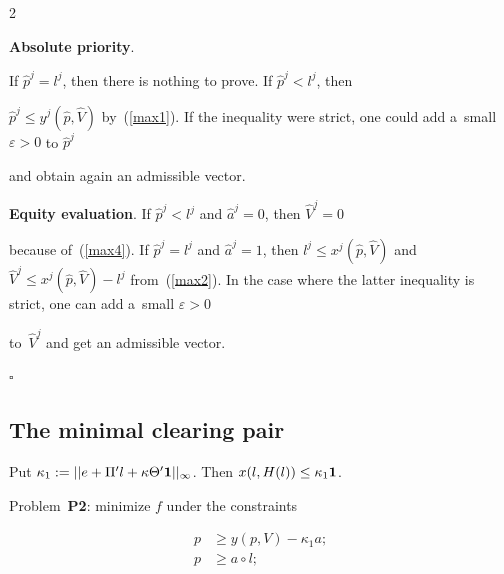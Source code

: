 \begin{multicols}{2}
\smallskip



 \noindent

 \textbf{Absolute priority}. 

 If $\hat p^j = l^j$, then there is nothing to prove. If $\hat p^j < l^j$, then 

 $\hat p^j \leq y^j(\hat  p,\hat  V)$ by~(\ref{max1}). If the inequality were strict, one could add a~small $\varepsilon>0$ to $\hat p^j$ 

 and obtain again an admissible vector.



\smallskip



\noindent

\textbf{Equity evaluation}. If $\hat p^j < l^j$ and $\hat a^j = 0$, then $\hat V^j = 0$ 

because of~(\ref{max4}). If $\hat p^j = l^j$ and $\hat a^j = 1$, then  $l^j \leq x^j(\hat  p,\hat  V)$ and $\hat V^j 

\leq x^j(\hat  p,\hat  V) - l^j$ from~(\ref{max2}). In the case where the latter inequality is strict, one can add a~small $\varepsilon>0$ 

to~$\hat V^j$ and get an admissible vector. 

 \hfill$\square$



\subsection{The minimal clearing pair}



\noindent

Put  $\kappa_1 := || e + \Pi'l +\kappa \Theta' {\bf 1} ||_\infty $. Then $x(l,H(l))\leq \kappa_1 {\bf 1}$.




Problem~{\bf P2}: minimize $f$ under the constraints 

\begin{align}

 \label{min1}

 p &\geq y(p,V) - \kappa_1 a; \\

 \label{min2}

 p &\geq a \circ l; \\


\end{align}
\end{multicols}
